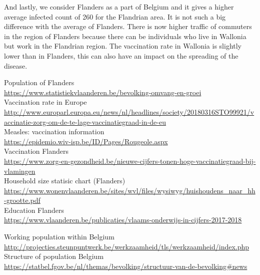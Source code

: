 \documentclass[runningheads]{llncs}
\begin{document}
    And lastly, we consider Flanders as a part of Belgium and it gives a higher average infected count of 260 for the Flandrian area. It is not such a big difference with the average of Flanders. There is now higher traffic of commuters in the region of Flanders because there can be individuals who live in Wallonia but work in the Flandrian region. The vaccination rate in Wallonia is slightly lower than in Flanders, this can also have an impact on the spreading of the disease.
	
	
	\newpage
	\begin{thebibliography}{20}
		Population of Flanders \\
		\url{https://www.statistiekvlaanderen.be/bevolking-omvang-en-groei}
		\\
		
		Vaccination rate in Europe \\
		\url{http://www.europarl.europa.eu/news/nl/headlines/society/20180316STO99921/vaccinatie-zorg-om-de-te-lage-vaccinatiegraad-in-de-eu}
		\\
		
		Measles: vaccination information \\
		\url{https://epidemio.wiv-isp.be/ID/Pages/Rougeole.aspx}
		\\
		
		Vaccination Flanders \\
		\url{https://www.zorg-en-gezondheid.be/nieuwe-cijfers-tonen-hoge-vaccinatiegraad-bij-vlamingen}
		\\
		
		Household size statisic chart (Flanders) \\
		\url{https://www.wonenvlaanderen.be/sites/wvl/files/wysiwyg/huishoudens\_naar\_hh-grootte.pdf}
		\\
		
		Education Flanders \\
		\url{https://www.vlaanderen.be/publicaties/vlaams-onderwijs-in-cijfers-2017-2018}
		
		Working population within Belgium \\
		\url{http://projecties.steunpuntwerk.be/werkzaamheid/tls/werkzaamheid/index.php}
		\\
		
		Structure of population Belgium \\
		\url{https://statbel.fgov.be/nl/themas/bevolking/structuur-van-de-bevolking\#news}
		\\
		

\end{thebibliography}
\end{document}
